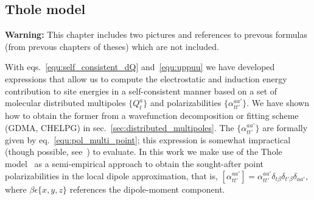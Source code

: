 \subsection{Thole model}
\label{sec:thole_model}

\textbf{Warning:}
This chapter includes two pictures and references to prevous
formulas (from prevous chapters of theses) which are not
included.



With eqs.~\ref{equ:self_consistent_dQ} and~\ref{equ:uppuu} we have developed expressions that allow us to compute the electrostatic and induction energy contribution to site energies in a self-consistent manner based on a set of molecular distributed multipoles $\{Q_t^a\}$ and polarizabilities $\{\alpha_{tt'}^{aa'}\}$. We have shown how to obtain the former from a wavefunction decomposition or fitting scheme (GDMA, CHELPG) in sec.~\ref{sec:distributed_multipoles}. The $\{\alpha_{tt'}^{aa'}\}$ are formally given by eq.~\ref{equ:pol_multi_point}; this expression is somewhat impractical (though possible, see~\cite{stone_distributed_1985}) to evaluate. In this work we make use of the Thole model~\cite{thole_molecular_1981, van_duijnen_molecular_1998} as a semi-empirical approach to obtain the sought-after point polarizabilities in the local dipole approximation, that is, $[\alpha_{tt'}^{aa'}] = \alpha_{tt'}^{aa'} \delta_{t \beta} \delta_{t'\beta} \delta_{aa'}$, where $\beta \epsilon \{x,y,z\}$ references the 
dipole-moment component.

